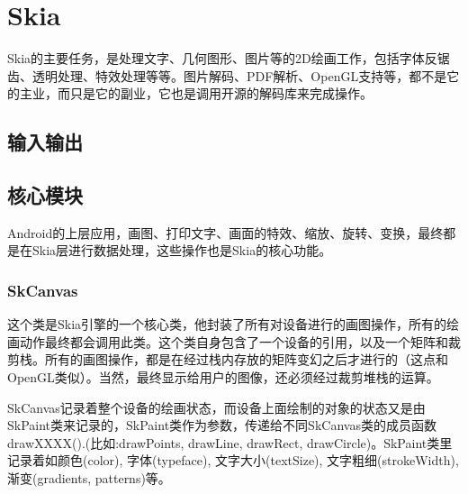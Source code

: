 
\section{Skia}
\label{sec:skia}
Skia的主要任务，是处理文字、几何图形、图片等的2D绘画工作，包括字体反锯齿、透明处理、特效处理等等。图片解码、PDF解析、OpenGL支持等，都不是它的主业，而只是它的副业，它也是调用开源的解码库来完成操作。

\subsection{输入输出}
\label{sec:skia-input-output}

\subsection{核心模块}
\label{sec:skia-core}
Android的上层应用，画图、打印文字、画面的特效、缩放、旋转、变换，最终都是在Skia层进行数据处理，这些操作也是Skia的核心功能。
\subsubsection{SkCanvas}
\label{sec:skia-skcanvas}
这个类是Skia引擎的一个核心类，他封装了所有对设备进行的画图操作，所有的绘画动作最终都会调用此类。这个类自身包含了一个设备的引用，以及一个矩阵和裁剪栈。所有的画图操作，都是在经过栈内存放的矩阵变幻之后才进行的（这点和OpenGL类似）。当然，最终显示给用户的图像，还必须经过裁剪堆栈的运算。

SkCanvas记录着整个设备的绘画状态，而设备上面绘制的对象的状态又是由SkPaint类来记录的，SkPaint类作为参数，传递给不同SkCanvas类的成员函数drawXXXX().(比如:drawPoints, drawLine, drawRect, drawCircle)。SkPaint类里记录着如颜色(color), 字体(typeface), 文字大小(textSize), 文字粗细(strokeWidth), 渐变(gradients, patterns)等。


